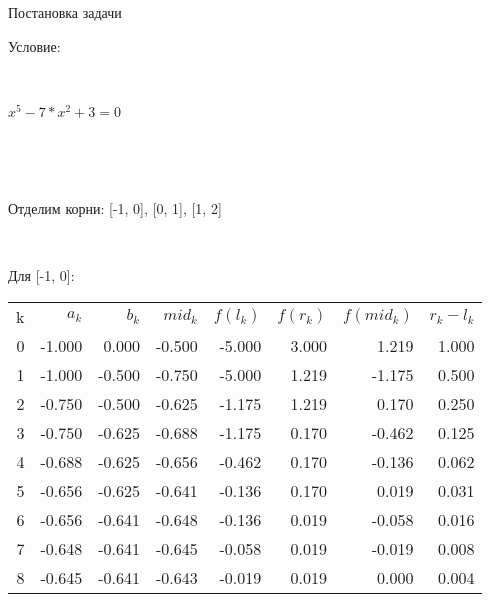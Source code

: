 \documentclass[]{article}
\author{Овчинников Никита 7 группа}
\begin{document}

\begin{center}
	Постановка задачи
\end{center}

Условие:

~

$x^5 - 7*x^2 + 3 = 0$

~

\begin{center}
\end{center}

~

Отделим корни: [-1, 0], [0, 1], [1, 2]

~

Для [-1, 0]:
\begin{center}
\begin{tabular}{ r r r r r r r r }
k & $a_k$ & $b_k$ & $mid_k$ & $f(l_k)$ & $f(r_k)$ & $f(mid_k)$ & $r_k-l_k$\\ 	
0 & -1.000 & 0.000 & -0.500 & -5.000 & 3.000 & 1.219 & 1.000 \\
1 & -1.000 & -0.500 & -0.750 & -5.000 & 1.219 & -1.175 & 0.500 \\
2 & -0.750 & -0.500 & -0.625 & -1.175 & 1.219 & 0.170 & 0.250 \\
3 & -0.750 & -0.625 & -0.688 & -1.175 & 0.170 & -0.462 & 0.125 \\
4 & -0.688 & -0.625 & -0.656 & -0.462 & 0.170 & -0.136 & 0.062 \\
5 & -0.656 & -0.625 & -0.641 & -0.136 & 0.170 & 0.019 & 0.031 \\
6 & -0.656 & -0.641 & -0.648 & -0.136 & 0.019 & -0.058 & 0.016 \\
7 & -0.648 & -0.641 & -0.645 & -0.058 & 0.019 & -0.019 & 0.008 \\
8 & -0.645 & -0.641 & -0.643 & -0.019 & 0.019 & 0.000 & 0.004 \\
\end{tabular}
\end{center}
\end{document}
